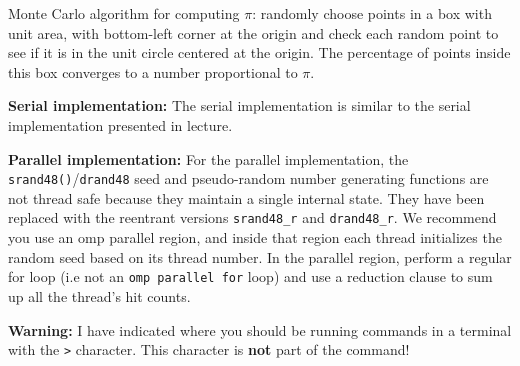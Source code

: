 \documentclass[letter]{article}
\begin{document}
Monte Carlo algorithm for computing $\pi$: randomly choose points in a box with unit area, with bottom-left corner at the origin and check each random point to see if it is in the unit circle centered at the origin.  The percentage of points inside this box converges to a number proportional to $\pi$.

\textbf{Serial implementation:} The serial implementation is similar to the serial implementation presented in lecture. 

\textbf{Parallel implementation:}  For the parallel implementation, the \texttt{srand48()}/\texttt{drand48} seed and pseudo-random number generating functions are not thread safe because they maintain a single internal state. They have been replaced with the reentrant versions \texttt{srand48\_r} and \texttt{drand48\_r}.  We recommend you use an omp parallel region, and inside that region each thread initializes the random seed based on its thread number.  In the parallel region, perform a regular for loop (i.e not an \texttt{omp parallel for} loop) and use a reduction clause to sum up all the thread’s hit counts.

\textbf{Warning:} I have indicated where you should be running commands in a terminal with the \texttt{>} character.  This character is \textbf{not} part of the command!
\end{document}
